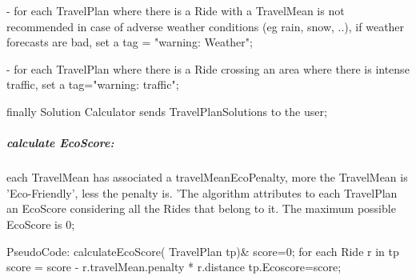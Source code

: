 	- for each TravelPlan where there is a Ride with a TravelMean is not recommended in case of adverse weather conditions (eg rain, snow, ..), if weather forecasts are bad, set a tag = "warning: Weather";\newline
	
	- for each TravelPlan where there is a Ride crossing an area where there is intense traffic, set a tag="warning: traffic"; \newline
	
	finally Solution Calculator sends TravelPlanSolutions to the user;\newline
	
	
	\subparagraph{calculate EcoScore:}	
	each TravelMean has associated a travelMeanEcoPenalty, more the TravelMean is 'Eco-Friendly', less the penalty is. 'The algorithm attributes to each TravelPlan an EcoScore considering all the Rides that belong to it.
	The maximum possible EcoScore is 0; \newline
	
	PseudoCode: \newline
	calculateEcoScore( TravelPlan tp)&{\newline
		score=0;\newline
		for each Ride r in tp{\newline
			score = score - r.travelMean.penalty * r.distance\newline
		}\newline
		tp.Ecoscore=score;\newline
	}\newline